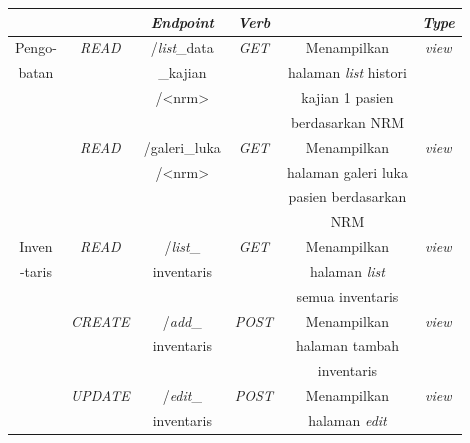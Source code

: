 \begin{enumerate}
\begin{table}[H]
\begin{tabular}{|c|c|c|c|c|c|}
			& & \textbf{\emph{Endpoint}} & \textbf{\emph{Verb}} & & \textbf{\emph{Type}} \\
			\hline
			
			Pengo-& 
			\emph{READ} &
			/\emph{list}\_data&
			\emph{GET} &
			Menampilkan &
			\emph{view}\\
			
			
			batan& 
			&
			\_kajian&
			&
			halaman \emph{list} histori&
			\\
			
			& 
			&
			/<nrm>&
			&
			 kajian 1 pasien&
			\\
			
			& 
			&
			&
			&
			berdasarkan NRM  &
			\\
			\hline
			
			& 
			\emph{READ} &
			/galeri\_luka&
			\emph{GET} &
			Menampilkan  &
			\emph{view}\\
			
			
			& 
			&
			/<nrm>&
			&
			halaman galeri luka  &
			\\
			
			& 
			&
			&
			&
			pasien berdasarkan&
			\\
			
			& 
			&
			&
			&
			NRM&
			\\
		
			\hline
			
			Inven& 
			\emph{READ} &
			/\emph{list}\_&
			\emph{GET} &
			Menampilkan&
			\emph{view}\\
			
			
			-taris& 
			&
			inventaris&
			&
			halaman \emph{list}&
			\\
			
			& 
			&
			&
			&
			semua inventaris&
			\\
			\hline
			
			& 
			\emph{CREATE} &
			/\emph{add}\_&
			\emph{POST} &
			Menampilkan &
			\emph{view}\\
			
			& 
			&
			inventaris&
			&
			halaman tambah&
			\\
			
			& 
			&
			&
			&
			inventaris&
			\\
			\hline
			
			& 
			\emph{UPDATE} &
			/\emph{edit}\_&
			\emph{POST} &
			Menampilkan &
			\emph{view}\\
			
			& 
			&
			inventaris&
			&
			halaman \emph{edit} &
			\\
			

\end{tabular}
\end{table}
\end{enumerate}

